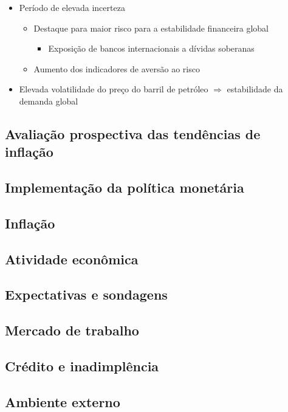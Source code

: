 \documentclass[11pt]{article}
\begin{document}
\begin{itemize}
\begin{itemize}
\end{itemize}
\item Período de elevada incerteza
\begin{itemize}
\item Destaque para maior risco para a estabilidade financeira global
\begin{itemize}
\item Exposição de bancos internacionais a dívidas soberanas
\end{itemize}
\item Aumento dos indicadores de aversão ao risco
\end{itemize}
\item Elevada volatilidade do preço do barril de petróleo \(\Rightarrow\) estabilidade da demanda global
\end{itemize}
\subsection*{Avaliação prospectiva das tendências de inflação}
\label{sec:org380044e}
\subsection*{Implementação da política monetária}
\label{sec:org88807d5}
\subsection*{Inflação}
\label{sec:org14ad9f1}
\subsection*{Atividade econômica}
\label{sec:org2798e7e}
\subsection*{Expectativas e sondagens}
\label{sec:org10edfc5}
\subsection*{Mercado de trabalho}
\label{sec:org73f77ae}
\subsection*{Crédito e inadimplência}
\label{sec:org61a301e}
\subsection*{Ambiente externo}
\label{sec:org6622f0b}
\end{document}
